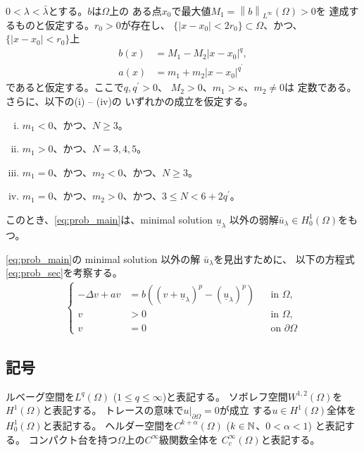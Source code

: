\begin{thm} \label{thm:second_solution}
 $0 < \lambda < \bar{\lambda}$とする。$b$は$\Omega$上の
 ある点$x_0$で最大値$M_1 = \left\| b \right\|_{L^\infty}(\Omega) > 0$を
 達成するものと仮定する。$r_0 > 0$が存在し、
 $\{ \lvert x - x_0 \rvert < 2r_0 \} \subset \Omega$、かつ、
 $\{ \lvert x - x_0 \rvert < r_0 \}$上
 \begin{align*}
  b(x) &= M_1 - M_2 \lvert x-x_0 \rvert^q,  \\
  a(x) &= m_1 + m_2 \lvert x-x_0 \rvert^{q^\prime}
 \end{align*}
 であると仮定する。ここで$q, q^\prime > 0$、
 $M_2 > 0$、$m_1 > \kappa$、$m_2 \neq 0$は
 定数である。さらに、以下の(i) -- (iv)の
 いずれかの成立を仮定する。
 \begin{enumerate}[(i)]
  \item $m_1 < 0$、かつ、$N \geq 3$。
  \item $m_1 > 0$、かつ、$N = 3, 4, 5$。
  \item $m_1 = 0$、かつ、$m_2 < 0$、かつ、$N \geq 3$。
  \item $m_1 = 0$、かつ、$m_2 > 0$、かつ、$3 \leq N < 6 + 2q^\prime$。
 \end{enumerate}
 このとき、\ref{eq:prob_main}は、minimal solution
 $\underline{u}_\lambda$
 以外の弱解$\bar{u}_\lambda \in H_0^1(\Omega)$をもつ。
\end{thm}

\ref{eq:prob_main}の minimal solution 以外の解
$\bar{u}_\lambda$を見出すために、
以下の方程式\ref{eq:prob_sec}を考察する。
\begin{align}
 \left\{
 \begin{aligned}
   -\Delta v + a v &= b \left( (v + \underline{u}_\lambda)^p -
  (\underline{u}_\lambda)^p \right) 
  & &\text{in~} \Omega, \\
  v &> 0 & &\text{in~} \Omega, \\
  v &= 0 & &\text{on~} \partial\Omega
 \end{aligned}
 \right. \tag*{$(\heartsuit)_\lambda$} \label{eq:prob_sec}
\end{align}

\subsection{記号}

ルベーグ空間を$L^q(\Omega)$ ($1 \leq q \leq \infty$)と表記する。
ソボレフ空間$W^{1, 2}(\Omega)$を$H^1(\Omega)$と表記する。
トレースの意味で$u |_{\partial \Omega} = 0$が成立
する$u \in H^1(\Omega)$全体を$H_0^1(\Omega)$と表記する。
ヘルダー空間を$C^{k + \alpha}(\Omega)$ ($k \in \mathbb{N}$、$0 < \alpha < 1$)
と表記する。
コンパクト台を持つ$\Omega$上の$C^\infty$級関数全体を
$C^\infty_c (\Omega)$と表記する。


